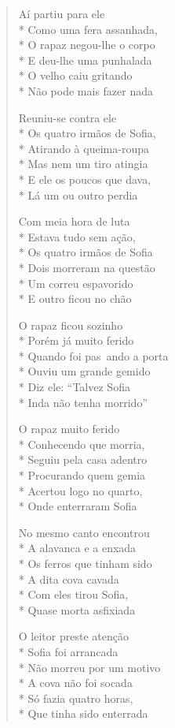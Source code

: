\begin{verse}
Aí partiu para ele\\*
Como uma fera assanhada,\\*
O rapaz negou-lhe o corpo\\*
E deu-lhe uma punhalada\\*
O velho caiu gritando\\*
Não pode mais fazer nada

Reuniu-se contra ele\\*
Os quatro irmãos de Sofia,\\*
Atirando à queima-roupa\\*
Mas nem um tiro atingia\\*
E ele os poucos que dava,\\*
Lá um ou outro perdia

Com meia hora de luta\\*
Estava tudo sem ação,\\*
Os quatro irmãos de Sofia\\*
Dois morreram na questão\\*
Um correu espavorido\\*
E outro ficou no chão

O rapaz ficou sozinho\\*
Porém já muito ferido\\*
Quando foi pas~ando a porta\\*
Ouviu um grande gemido\\*
Diz ele: ``Talvez Sofia\\*
Inda não tenha morrido''

O rapaz muito ferido\\*
Conhecendo que morria,\\*
Seguiu pela casa adentro\\*
Procurando quem gemia\\*
Acertou logo no quarto,\\*
Onde enterraram Sofia

No mesmo canto encontrou\\*
A alavanca e a enxada\\*
Os ferros que tinham sido\\*
A dita cova cavada\\*
Com eles tirou Sofia,\\*
Quase morta asfixiada

O leitor preste atenção\\*
Sofia foi arrancada\\*
Não morreu por um motivo\\*
A cova não foi socada\\*
Só fazia quatro horas,\\*
Que tinha sido enterrada


\end{verse}
